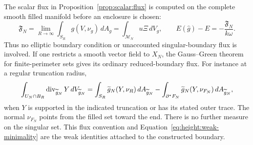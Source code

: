 \begin{remark}\label{rem:height:flux}
The scalar flux in Proposition~\ref{prop:scalar:flux} is computed on
the complete smooth filled manifold before an enclosure is chosen:
\[
 \mathfrak F_N=\lim_{R\to\infty}\int_{S_R}g(V,\nu_g)\,dA_g
 =\int_{\mathcal M_N}u\Xi\,dV_g,
 \qquad E(\widehat g)-E=-\frac{\mathfrak F_N}{k\omega}.
\]
Thus no elliptic boundary condition or unaccounted singular-boundary
flux is involved.  If one restricts a smooth vector field to $X_N$,
the Gauss--Green theorem for finite-perimeter sets gives its ordinary
reduced-boundary flux.  For instance at a regular truncation radius,
\[
 \int_{U_N\cap B_R}\operatorname{div}_{\widetilde g_N}Y\,dV_{\widetilde g_N}
 =\int_{S_R}\widetilde g_N(Y,\nu_R)\,dA_{\widetilde g_N}
 -\int_{\partial^*F_N}\widetilde g_N(Y,\nu_{F_N})\,
 dA_{\widetilde g_N},
\]
when $Y$ is supported in the indicated truncation or has its stated
outer trace.  The normal $\nu_{F_N}$ points from the filled set toward
the end.  There is no further measure on the singular set.  This flux
convention and Equation~\eqref{eq:height:weak-minimality} are the weak
identities attached to the constructed boundary.
\end{remark}
